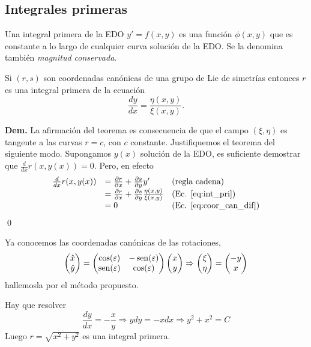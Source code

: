  \subsection{Integrales primeras}
\begin{definicion} Una integral primera de la EDO $y'=f(x,y)$ es una función $\phi(x,y)$ que es constante a lo largo de cualquier curva solución de la EDO. Se la denomina también \emph{magnitud conservada}.
 \end{definicion}



 \begin{teorema} Si $(r,s)$ son coordenadas canónicas de una grupo de Lie de simetrías entonces $r$ es una integral primera de la ecuación
\begin{equation}\label{eq:int_pri} \frac{dy}{dx}=\frac{\eta(x,y)}{\xi(x,y)}.
\end{equation}
\end{teorema}
\textbf{Dem.} La afirmación del teorema es consecuencia de que el campo $(\xi,\eta)$ es tangente a las curvas $r=c$, con $c$ constante. Justifiquemos el teorema del siguiente modo.  Supongamos $y(x)$ solución de la EDO, es suficiente demostrar que $\frac{d}{dx}r(x,y(x))=0$. Pero, en efecto
\[
\begin{array}{lll}
 \frac{d}{dx}r(x,y(x)) &=\frac{\partial r}{\partial x}+\frac{\partial s}{\partial y}y' &\text{(regla cadena)}\\
&=\frac{\partial r}{\partial x}+\frac{\partial s}{\partial y}\frac{\eta(x,y)}{\xi(x,y)}& \text{(Ec. \eqref{eq:int_pri})}\\
&=0 & \text{(Ec. \eqref{eq:coor_can_dif})}\\
\end{array}
\]
\qed

\begin{ejemplo} Ya conocemos las coordenadas canónicas de las rotaciones,
 \[
 \begin{pmatrix} \hat{x}\\ \hat{y}
\end{pmatrix}=\begin{pmatrix} \cos(\varepsilon) & -\operatorname{sen}(\varepsilon)
\\ \operatorname{sen}(\varepsilon) & \cos(\varepsilon)
\end{pmatrix} \begin{pmatrix} x\\ y
\end{pmatrix}\Rightarrow  \begin{pmatrix} \xi\\ \eta
\end{pmatrix}= \begin{pmatrix} -y\\ x
\end{pmatrix}
\]
hallemosla por el método propuesto.
\end{ejemplo}
Hay que resolver
\[\frac{dy}{dx}=-\frac{x}{y}\Rightarrow ydy=-xdx\Rightarrow y^2+x^2=C\]
Luego $r=\sqrt{x^2+y^2}$ es una integral primera. 



